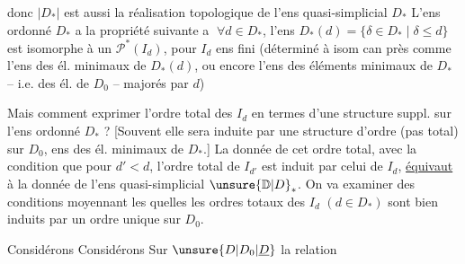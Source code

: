 donc $|D_{*}|$ est aussi la réalisation topologique de l'ens quasi-simplicial $D_*$
L'ens ordonné $D_*$ a la propriété suivante
\textcircled{a} $\forall d\in D_*$, l'ens  $D_*(d)=\{\delta\in D_*\mid\delta\leq d\}$ est isomorphe à un $\mathscr P^*(I_d)$, pour $I_d$ ens fini
(déterminé à isom can près comme l'ens des él. minimaux de $D_*(d)$, ou encore l'ens des éléments minimaux de $D_*$ --  i.e. des él. de $D_0$ -- majorés par $d$)

Mais comment exprimer l'ordre total des $I_d$  en termes d'une structure suppl. sur l'ens ordonné $D_*$ ? [Souvent elle sera induite par une structure d'ordre (pas total) sur $D_0$, ens des él. minimaux de $D_*$.]
La donnée de cet ordre total, avec la condition que pour $d'<d$, l'ordre total de $I_{d'}$ est induit par celui de $I_d$, \uline{équivaut} à la donnée de l'ens quasi-simplicial $\unsure{\mathbb D|D}_*$. On va examiner des
\margin{$\vert\,\vert\,\vert$}conditions  moyennant les quelles les ordres totaux des $I_d$ $(d\in D_*)$ sont bien induits par un ordre unique sur $D_0$.

Considérons
Considérons Sur $\unsure{D|D_0|\underline D}$ la relation

